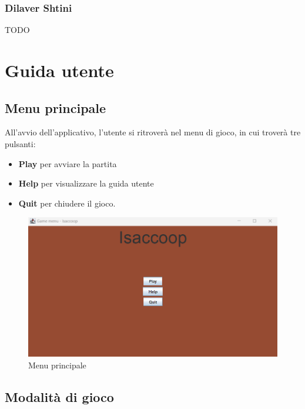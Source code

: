 \documentclass[a4paper,12pt]{report}
\begin{document}
\subsection*{Dilaver Shtini}
{TODO}


\appendix
\chapter{Guida utente}

\section*{Menu principale}
All'avvio dell'applicativo, l'utente si ritroverà nel menu di gioco, in cui troverà tre pulsanti:
\begin{itemize}
    \item \textbf{Play} per avviare la partita
    \item \textbf{Help} per visualizzare la guida utente 
    \item \textbf{Quit} per chiudere il gioco.
\end{itemize}
\begin{figure}[h]
\centering{}
\includegraphics[width=\textwidth]{img/mainMenu.png}
\caption{Menu principale}
\label{img/standardRoom.png}
\end{figure}

\section*{Modalità di gioco}
\end{document}
